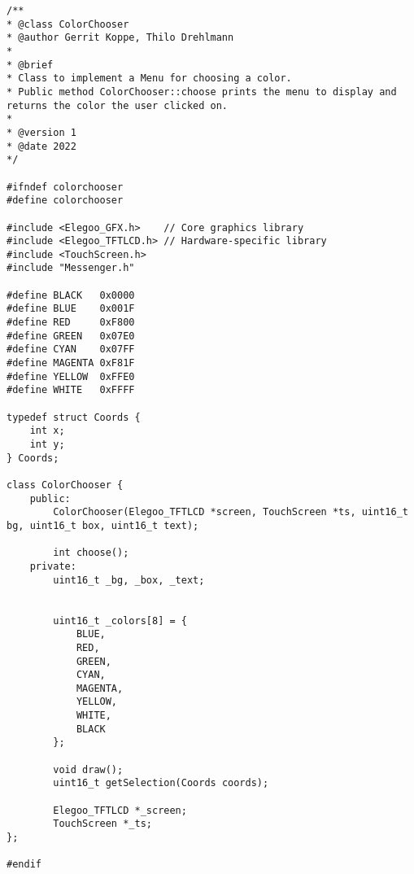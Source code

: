 \documentclass[a4paper, 11pt]{scrartcl}
\begin{document}
\begin{lstlisting}
/**
* @class ColorChooser
* @author Gerrit Koppe, Thilo Drehlmann
* 
* @brief
* Class to implement a Menu for choosing a color.
* Public method ColorChooser::choose prints the menu to display and returns the color the user clicked on. 
* 
* @version 1
* @date 2022
*/

#ifndef colorchooser
#define colorchooser

#include <Elegoo_GFX.h>    // Core graphics library
#include <Elegoo_TFTLCD.h> // Hardware-specific library
#include <TouchScreen.h>
#include "Messenger.h"

#define	BLACK   0x0000
#define	BLUE    0x001F
#define	RED     0xF800
#define	GREEN   0x07E0
#define CYAN    0x07FF
#define MAGENTA 0xF81F
#define YELLOW  0xFFE0
#define WHITE   0xFFFF

typedef struct Coords {
    int x;
    int y;
} Coords;

class ColorChooser {
    public:
        ColorChooser(Elegoo_TFTLCD *screen, TouchScreen *ts, uint16_t bg, uint16_t box, uint16_t text);

        int choose();
    private:
        uint16_t _bg, _box, _text;

        
        uint16_t _colors[8] = {
            BLUE,
            RED,
            GREEN,
            CYAN,
            MAGENTA,
            YELLOW,
            WHITE,
            BLACK
        };

        void draw();
        uint16_t getSelection(Coords coords);

        Elegoo_TFTLCD *_screen;
        TouchScreen *_ts;
};

#endif
\end{lstlisting}
\end{document}
